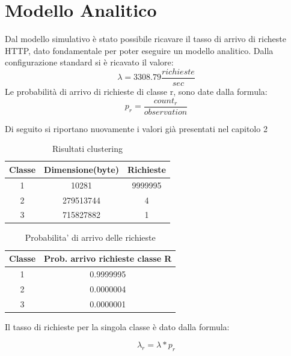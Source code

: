 \chapter{Modello Analitico}
Dal modello simulativo è stato possibile ricavare il tasso di arrivo di richeste HTTP, dato fondamentale per poter eseguire un modello analitico. Dalla configurazione standard si è ricavato il valore: 
\begin{equation}
\lambda =  3308.79 \frac{richieste}{sec}
\end{equation}
Le probabilità di arrivo di richieste di classe r, sono date dalla formula:
\begin{equation}
p_{r} = \frac{count_{r}}{observation}
\end{equation}
\begin{flushleft}
Di seguito si riportano nuovamente i valori già presentati nel capitolo 2
\end{flushleft}
\begin{table}[H]
\begin{center}
\begin{tabular}{||c|c|c||}
\hline
Classe	&Dimensione(byte)		&Richieste \\ 
\hline\hline
1 &10281 &9999995\\ \hline
2 &279513744 &4 \\ \hline
3 &715827882 &1 \\ \hline
\end{tabular}
\end{center}
\caption{Risultati clustering}
\label{risclustering}
\end{table}
\begin{table}[H]
\begin{center}
\begin{tabular}{||c|c||}
\hline
Classe		&Prob. arrivo richieste classe R	\\
\hline
\hline
1		&0.9999995	\\
\hline
2		&0.0000004\\
\hline
3		&0.0000001\\
\hline
\end{tabular}
\end{center}
\caption{Probabilita' di arrivo delle richieste}
\label{test_2}
\end{table}
\begin{flushleft}
Il tasso di richieste per la singola classe è dato dalla formula:
\end{flushleft}
\begin{equation}
\lambda_{r} = \lambda*p_{r}
\end{equation}

